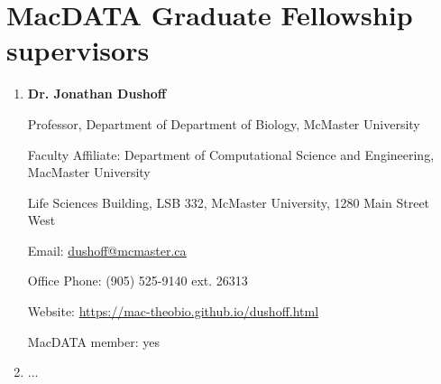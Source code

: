 \section{MacDATA Graduate Fellowship supervisors}

\begin{enumerate}

\item \textbf{Dr. Jonathan Dushoff}

Professor, Department of Department of Biology, McMaster University

Faculty Affiliate: Department of Computational Science and Engineering, MacMaster University

Life Sciences Building, LSB 332, McMaster University, 1280 Main Street West

Email: \href{mailto:dushoff@mcmaster.ca}{dushoff@mcmaster.ca}

Office Phone: (905) 525-9140 ext. 26313

Website: \href{https://mac-theobio.github.io/dushoff.html}{https://mac-theobio.github.io/dushoff.html}

MacDATA member: yes
\item ...
\end{enumerate}

